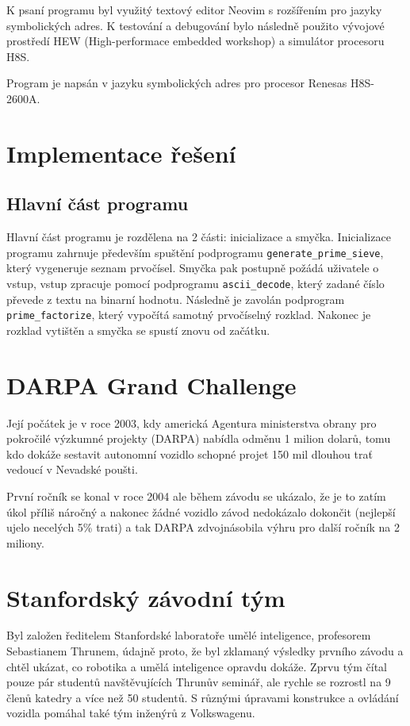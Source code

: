 \documentclass[12pt]{article}
\newcommand{\code}[1]{\colorbox{light-gray}{\mbox{\texttt{#1}}}}
\begin{document}
K psaní programu byl využitý textový editor Neovim s rozšířením pro jazyky symbolických
adres. K testování a debugování bylo následně použito vývojové prostředí HEW (High-performace
embedded workshop) a simulátor procesoru H8S.

Program je napsán v jazyku symbolických adres pro procesor Renesas H8S-2600A.

\section{Implementace řešení}

\subsection{Hlavní část programu}



Hlavní část programu je rozdělena na 2 části: inicializace a smyčka. Inicializace programu
zahrnuje především spuštění podprogramu \code{generate\_prime\_sieve}, který vygeneruje seznam 
prvočísel. Smyčka pak postupně požádá uživatele o vstup, vstup zpracuje pomocí podprogramu 
\code{ascii\_decode}, který zadané číslo převede z textu na binarní hodnotu. Následně je zavolán
podprogram \code{prime\_factorize}, který vypočítá samotný prvočíselný rozklad. Nakonec je
rozklad vytištěn a smyčka se spustí znovu od začátku.


\section{DARPA Grand Challenge}
Její počátek je v roce 2003, kdy americká Agentura ministerstva obrany pro pokročilé výzkumné projekty
(DARPA) nabídla odměnu 1 milion dolarů, tomu kdo dokáže sestavit autonomní vozidlo schopné projet
150 mil dlouhou trať vedoucí v Nevadské poušti.

První ročník se konal v roce 2004 ale během závodu se ukázalo, že je to zatím úkol příliš náročný
a nakonec žádné vozidlo závod nedokázalo dokončit (nejlepší ujelo necelých 5\% trati) a tak DARPA
zdvojnásobila výhru pro další ročník na 2 miliony.

\section{Stanfordský závodní tým}
Byl založen ředitelem Stanfordské laboratoře umělé inteligence, profesorem Sebastianem Thrunem,
údajně proto, že byl zklamaný výsledky prvního závodu a chtěl ukázat, co robotika a umělá inteligence
opravdu dokáže. Zprvu tým čítal pouze pár studentů navštěvujících Thrunův seminář, ale rychle
se rozrostl na 9 členů katedry a více než 50 studentů. S různými úpravami konstrukce a ovládání
vozidla pomáhal také tým inženýrů z Volkswagenu.
\end{document}
